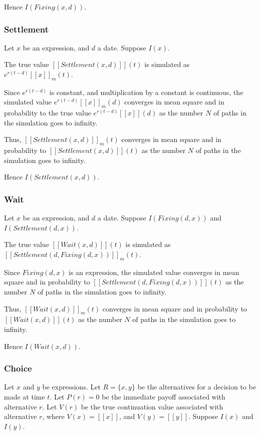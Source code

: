 \documentclass[a4paper,11pt]{article}
\newcommand{\sembrack}[1]{[\![#1]\!]}
\begin{document}
Hence $I(Fixing(x, d))$.

\subsubsection{Settlement}
Let $x$ be an expression, and $d$ a date. Suppose $I(x)$.

The true value $\sembrack{Settlement(x,d)}(t)$ is simulated as $e^{r(t-d)} \sembrack{x}_m(t)$.

Since $e^{r(t-d)}$ is constant, and multiplication by a constant is continuous, the simulated value $e^{r(t-d)} \sembrack{x}_m(d)$ converges in mean square and in probability to the true value $e^{r(t-d)} \sembrack{x}(d)$ as the number $N$ of paths in the simulation goes to infinity.

Thus, $\sembrack{Settlement(x,d)}_m(t)$ converges in mean square and in probability to $\sembrack{Settlement(x,d)}(t)$ as the number $N$ of paths in the simulation goes to infinity.

Hence $I(Settlement(x,d))$.

\subsubsection{Wait}
Let $x$ be an expression, and $d$ a date. Suppose $I(Fixing(d,x))$ and $I(Settlement(d,x))$.

The true value $\sembrack{Wait(x,d)}(t)$ is simulated as $\sembrack{Settlement(d,Fixing(d, x))}_m(t)$.

Since $Fixing(d,x)$ is an expression, the simulated value converges in mean square and in probability to $\sembrack{Settlement(d,Fixing(d, x))}(t)$ as the number $N$ of paths in the simulation goes to infinity.

Thus, $\sembrack{Wait(x,d)}_m(t)$ converges in mean square and in probability to $\sembrack{Wait(x,d)}(t)$ as the number $N$ of paths in the simulation goes to infinity.

Hence $I(Wait(x,d))$.

\subsubsection{Choice}
Let $x$ and $y$ be expressions. Let $R = \{x, y\}$ be the alternatives for a decision to be made at time $t$. Let $P(r) = 0$ be the immediate payoff associated with alternative $r$. Let $V(r)$ be the true continuation value associated with alternative $r$, where $V(x) = \sembrack{x}$, and $V(y) = \sembrack{y}$. Suppose $I(x)$ and $I(y)$.
\end{document}
